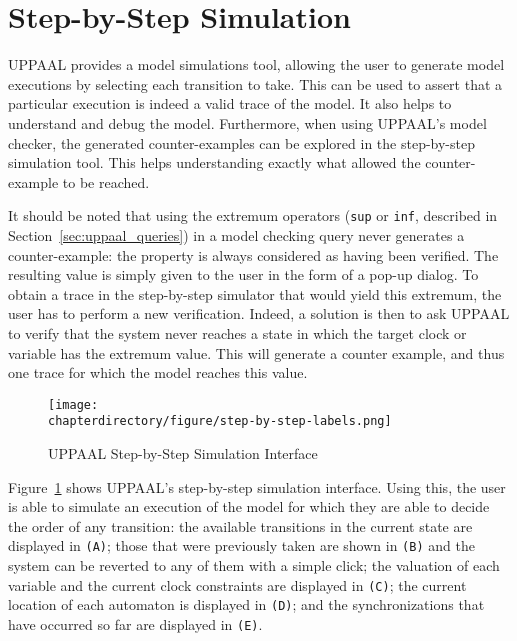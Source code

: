 \section{Step-by-Step Simulation}
\label{sec:analysis:step-by-step}
\label{sec:modeling:step-by-step}

UPPAAL provides a model simulations tool, allowing the user to generate model
executions by selecting each transition to take. This can be used to assert
that a particular execution is indeed a valid trace of the model. It also helps
to understand and debug the model. Furthermore, when using UPPAAL's model
checker, the generated counter-examples can be explored in the
step-by-step simulation tool. This helps understanding exactly what allowed the
counter-example to be reached.

It should be noted that using the extremum operators (\texttt{sup} or
\texttt{inf}, described in Section~\ref{sec:uppaal_queries}) in a model
checking query never generates a counter-example: the property is always
considered as having been verified. The resulting value is simply given to the
user in the form of a pop-up dialog. To obtain a trace in the step-by-step
simulator that would yield this extremum, the user has to perform a new
verification. Indeed, a solution is then to ask UPPAAL to verify that the
system never reaches a state in which the target clock or variable has the
extremum value. This will generate a counter example, and thus one trace for
which the model reaches this value.

\begin{figure}[hbt!]
\begin{center}
\texttt{[image: \\chapterdirectory/figure/step-by-step-labels.png]}
\end{center}
\caption{UPPAAL Step-by-Step Simulation Interface}
\label{fig:UPPAAL:step-by-step}
\end{figure}

Figure~\ref{fig:UPPAAL:step-by-step} shows UPPAAL's step-by-step simulation
interface. Using this, the user is able to simulate an execution of the model
for which they are able to decide the order of any transition: the available
transitions in the current state are displayed in \lstinline!(A)!; those
that were previously taken are shown in \lstinline!(B)! and the system can be
reverted to any of them with a simple click; the valuation of each variable and
the current clock constraints are displayed in \lstinline!(C)!; the current
location of each automaton is displayed in \lstinline!(D)!; and the
synchronizations that have occurred so far are displayed in \lstinline!(E)!.
